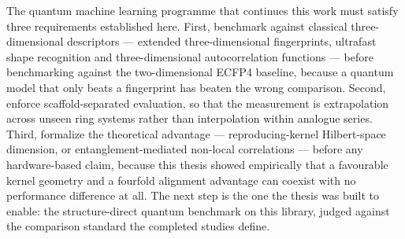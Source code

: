 The quantum machine learning programme that continues this work must satisfy three requirements established here. First, benchmark against classical three-dimensional descriptors --- extended three-dimensional fingerprints, ultrafast shape recognition and three-dimensional autocorrelation functions --- before benchmarking against the two-dimensional ECFP4 baseline, because a quantum model that only beats a fingerprint has beaten the wrong comparison. Second, enforce scaffold-separated evaluation, so that the measurement is extrapolation across unseen ring systems rather than interpolation within analogue series. Third, formalize the theoretical advantage --- reproducing-kernel Hilbert-space dimension, or entanglement-mediated non-local correlations --- before any hardware-based claim, because this thesis showed empirically that a favourable kernel geometry and a fourfold alignment advantage can coexist with no performance difference at all. The next step is the one the thesis was built to enable: the structure-direct quantum benchmark on this library, judged against the comparison standard the completed studies define.

